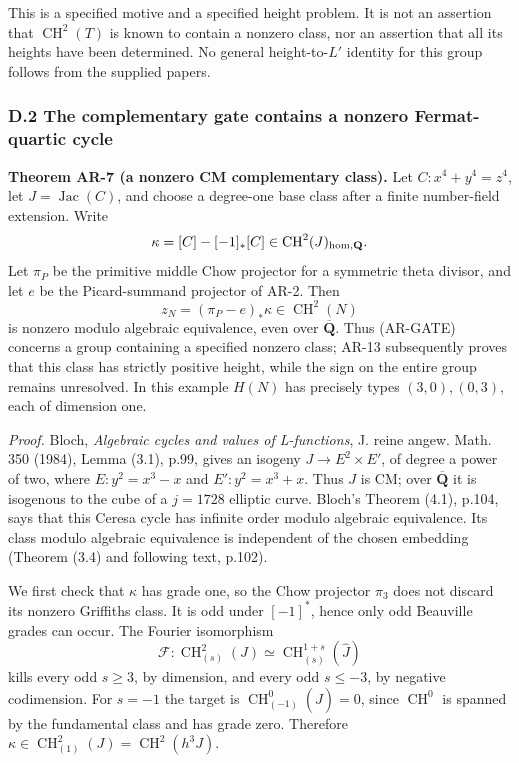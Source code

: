 This is a specified motive and a specified height problem. It is not an
assertion that \(\operatorname{CH}^2(T)\) is known to contain a nonzero
class, nor an assertion that all its heights have been determined. No
general height-to-\(L'\) identity for this group follows from the
supplied papers.

\subsubsection{D.2 The complementary gate contains a nonzero
Fermat-quartic
cycle}\label{d.2-the-complementary-gate-contains-a-nonzero-fermat-quartic-cycle}

\textbf{Theorem AR-7 (a nonzero CM complementary class).} Let
\(C:x^4+y^4=z^4\), let \(J=\operatorname{Jac}(C)\), and choose a
degree-one base class after a finite number-field extension. Write \[
\kappa=[C]-[-1]_*[C]\in\operatorname{CH}^2(J)_{\rm hom,\mathbf Q}.
\] Let \(\pi_P\) be the primitive middle Chow projector for a symmetric
theta divisor, and let \(e\) be the Picard-summand projector of AR-2.
Then \[
z_N=(\pi_P-e)_*\kappa\in\operatorname{CH}^2(N)
\tag{AR.9}
\] is nonzero modulo algebraic equivalence, even over
\(\overline{\mathbf Q}\). Thus (AR-GATE) concerns a group containing a
specified nonzero class; AR-13 subsequently proves that this class has
strictly positive height, while the sign on the entire group remains
unresolved. In this example \(H(N)\) has precisely types
\((3,0),(0,3)\), each of dimension one.

\emph{Proof.} Bloch, \emph{Algebraic cycles and values of L-functions},
J. reine angew. Math. 350 (1984), Lemma (3.1), p.99, gives an isogeny
\(J\to E^2\times E'\), of degree a power of two, where \(E:y^2=x^3-x\)
and \(E':y^2=x^3+x\). Thus \(J\) is CM; over \(\overline{\mathbf Q}\) it
is isogenous to the cube of a \(j=1728\) elliptic curve. Bloch's Theorem
(4.1), p.104, says that this Ceresa cycle has infinite order modulo
algebraic equivalence. Its class modulo algebraic equivalence is
independent of the chosen embedding (Theorem (3.4) and following text,
p.102).

We first check that \(\kappa\) has grade one, so the Chow projector
\(\pi_3\) does not discard its nonzero Griffiths class. It is odd under
\([-1]^*\), hence only odd Beauville grades can occur. The Fourier
isomorphism \[
\mathcal F:\operatorname{CH}^2_{(s)}(J)
 \simeq\operatorname{CH}^{1+s}_{(s)}(\widehat J)
\] kills every odd \(s\ge3\), by dimension, and every odd \(s\le-3\), by
negative codimension. For \(s=-1\) the target is
\(\operatorname{CH}^0_{(-1)}(\widehat J)=0\), since
\(\operatorname{CH}^0\) is spanned by the fundamental class and has
grade zero. Therefore
\(\kappa\in\operatorname{CH}^2_{(1)}(J)=\operatorname{CH}^2(h^3J)\).


